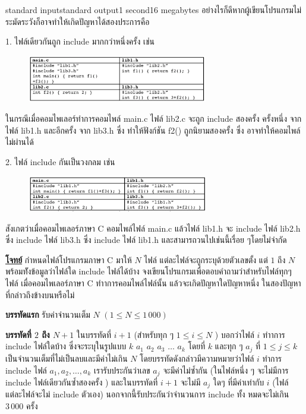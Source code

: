\documentclass[11pt,a4paper]{article}
\begin{document}
\begin{problem}{}{standard input}{standard output}{1 second}{16 megabytes}
อย่างไรก็ดีหากผู้เขียนโปรแกรมไม่ระมัดระวังก็อาจทำให้เกิดปัญหาได้สองประการคือ

1. ไฟล์เดียวกันถูก include มากกว่าหนึ่งครั้ง เช่น


\begin{figure}[h!]
\centering
\includegraphics[width=0.7\textwidth]{../latex/img/1057/1057-5.png}
\end{figure}


ในกรณีเมื่อคอมไพเลอร์ทำการคอมไพล์ main.c ไฟล์ lib2.c จะถูก include สองครั้ง ครั้งหนึ่ง จากไฟล์ lib1.h และอีกครั้ง จาก lib3.h ซึ่ง ทำให้ฟังก์ชัน f2() ถูกนิยามสองครั้ง ซึ่ง อาจทำให้คอมไพล์ไม่ผ่านได้

2. ไฟล์ include กันเป็นวงกลม เช่น

\begin{figure}[h!]
\centering
\includegraphics[width=0.7\textwidth]{../latex/img/1057/1057-6.png}
\end{figure}



สังเกตว่าเมื่อคอมไพเลอร์ภาษา C คอมไพล์ไฟล์ main.c แล้วไฟล์ lib1.h จะ include ไฟล์ lib2.h ซึ่ง include ไฟล์ lib3.h ซึ่ง include ไฟล์ lib1.h และสามารถวนไปเช่นนี้เรื่อย ๆโดยไม่จำกัด



\bigskip
\underline{\textbf{โจทย์}}  กำหนดไฟล์โปรแกรมภาษา C มาให้ $N$ ไฟล์ แต่ละไฟล์จะถูกระบุด้วยตัวเลขตั้ง แต่ $1$ ถึง $N$ พร้อมทัังข้อมูลว่าไฟล์ใด include ไฟล์ได้บ้าง จงเขียนโปรแกรมเพื่อตอบคำถามว่าสำหรับไฟล์ทุกๆ ไฟล์ เมื่อคอมไพเลอร์ภาษา C ทำาการคอมไพล์ไฟล์นั้น แล้วจะเกิดปัญหาใดปัญหาหนึ่ง ในสองปัญหาที่กล่าวถึงข้างบนหรือไม่

\InputFile

\textbf{บรรทัดแรก} รับค่าจำนวนเต็ม $N$ $(1 \leq N \leq 1\,000)$

\textbf{บรรทัดที่ $2$ ถึง $N+1$}  ในบรรทัดที่ $i+1$ (สำหรับทุก ๆ $1 \leq i \leq N$ ) บอกว่าไฟล์ $i$ ทำาการ include ไฟล์ใดบ้าง ซึ่งจะระบุในรูปแบบ $k$ $a_1$ $a_2$ $a_3$ $…$ $a_k$ โดยที่ $k$ และทุก ๆ $a_j$ ที่ $1 \leq j \leq k$ เป็นจำนวนเต็มที่ไม่เป็นลบและมีค่าไม่เกิน $N$ โดยบรรทัดดังกล่าวมีความหมายว่าไฟล์ $i$ ทำการ include ไฟล์ $a_1, a_2, …, a_k$ เรารับประกันว่าเลข $a_j$ จะมีค่าไม่ซ้ำกัน (ในไฟล์หนึ่ง ๆ จะไม่มีการ include ไฟล์เดียวกันซ้ำสองครั้ง ) และในบรรทัดที่ $i + 1$ จะไม่มี $a_j$ ใดๆ ที่มีค่าเท่ากับ $i$ (ไฟล์แต่ละไฟล์จะไม่ include ตัวเอง) นอกจากนี้รับประกันว่าจำนวนการ include ทั้ง หมดจะไม่เกิน $3\,000$ ครั้ง



\end{problem}
\end{document}
